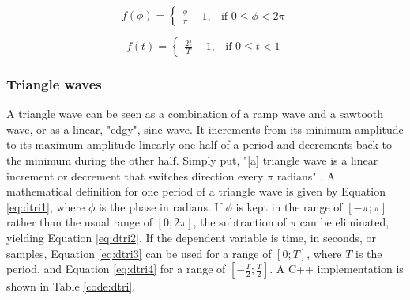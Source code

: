 \documentclass[12pt,twoside]{report}
\begin{document}
\begin{multicols}{2}

  \begin{equation}
    f(\phi) =
    \begin{cases}
      \frac{\phi}{\pi} - 1,& \text{if } 0 \leq \phi < 2 \pi
    \end{cases}
    \label{eq:dramp1}
  \end{equation}

  \begin{equation}
    f(t) =
    \begin{cases}
      \frac{2t}{T} - 1,& \text{if } 0 \leq t < 1
    \end{cases}
    \label{eq:dramp2}
  \end{equation}

\end{multicols}

\begin{table}
\end{table}

\pagebreak

\subsubsection{Triangle waves}

A triangle wave can be seen as a combination of a ramp wave and a sawtooth wave, or as a linear, "edgy", sine wave. It increments from its minimum amplitude to its maximum amplitude linearly one half of a period and decrements back to the minimum during the other half. Simply put, "[a] triangle wave is a linear increment or decrement that switches direction every $\pi$ radians" . A mathematical definition for one period of a triangle wave is given by Equation  \ref{eq:dtri1}, where $\phi$ is the phase in radians. If $\phi$ is kept in the range of $[-\pi;\pi]$ rather than the usual range of $[0;2 \pi]$, the subtraction of $\pi$ can be eliminated, yielding Equation  \ref{eq:dtri2}. If the dependent variable is time, in seconds, or samples, Equation  \ref{eq:dtri3} can be used for a range of $[0;T]$, where $T$ is the period, and Equation  \ref{eq:dtri4} for a range of $[-\frac{T}{2};\frac{T}{2}]$. A C++ implementation is shown in Table \ref{code:dtri}.
\end{document}
